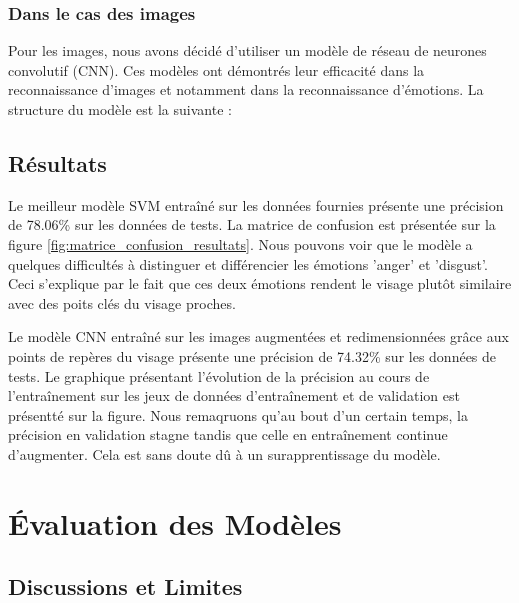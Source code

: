 \documentclass{rapport}
\begin{document}
\subsubsection{Dans le cas des images}
Pour les images, nous avons décidé d'utiliser un modèle de réseau de neurones convolutif (CNN). Ces modèles ont démontrés
leur efficacité dans la reconnaissance d'images et notamment dans la reconnaissance d'émotions. La structure du modèle est la suivante :\\

\subsection{Résultats}

Le meilleur modèle SVM entraîné sur les données fournies présente une précision de 78.06\% sur les données de tests. La matrice de confusion est présentée
sur la figure \ref*{fig:matrice_confusion_resultats}. Nous pouvons voir que le modèle a quelques difficultés à distinguer
et différencier les émotions 'anger' et 'disgust'. Ceci s'explique par le fait que ces deux émotions rendent le visage plutôt similaire avec
des poits clés du visage proches.\\


Le modèle CNN entraîné sur les images augmentées et redimensionnées grâce aux points de repères du visage présente une précision
de 74.32\% sur les données de tests. Le graphique présentant l'évolution de la précision au cours de l'entraînement
sur les jeux de données d'entraînement et de validation est présentté sur la figure. Nous remaqruons qu'au bout d'un certain temps, la précision
en validation stagne tandis que celle en entraînement continue d'augmenter. Cela est sans doute dû à un surapprentissage du modèle.


\section{Évaluation des Modèles}
\subsection{Discussions et Limites}
\end{document}
